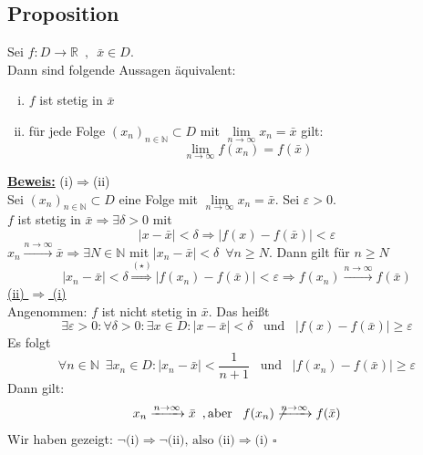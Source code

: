 \subsection{Proposition} %
\label{sub:proposition}
Sei $f: D \to \mathds{R} \enspace , \enspace \bar x \in D$. \\
Dann sind folgende Aussagen äquivalent:
\begin{enumerate}[(i)]
	\item $f$ ist stetig in $\bar x$
	\item für jede Folge $(x_n)_{n \in \mathds{N}} \subset D$ mit 
	$\lim\limits_{n \to \infty} x_n = \bar x$ gilt:
	\[
		\lim\limits_{n \to \infty} f(x_n) = f(\bar x)
	\]
\end{enumerate}
\underline{\textbf{Beweis:}} (i)$\Rightarrow$(ii)\\
Sei $(x_n)_{n \in \mathds{N}} \subset D$ eine Folge mit $\lim\limits_{n \to \infty} x_n = \bar x$. Sei $\varepsilon>0$.
\vspace{10pt} \\
$f$ ist stetig in $\bar x \Longrightarrow \exists \delta >0$ mit 
\[
	|x- \bar x|< \delta \Longrightarrow |f(x)-f(\bar x)|< \varepsilon \tag{$\star$}
\] 
$x_n \xrightarrow{n \to \infty} \bar x \Rightarrow \exists N \in \mathds{N}$ mit
$|x_n - \bar x|< \delta \enspace \forall n \geq N$. Dann gilt für $n \geq N$
\[
	|x_n - \bar x| < \delta \overset{(\star)}{\Rightarrow} |f(x_n)- f(\bar x)|<
	\varepsilon \Rightarrow f(x_n) \xrightarrow{n \to \infty} f(\bar x)
\]
\underline{(ii) $\Rightarrow$ (i)} \\
Angenommen: $f$ ist nicht stetig in $\bar x$. Das heißt
\[
	\exists \varepsilon >0 : \forall \delta>0 : \exists x \in D : |x - \bar x|< \delta
	\enspace \text{ und } \enspace |f(x)-f(\bar x)| \ge \varepsilon
\]
Es folgt 
\[
	\forall n \in \mathds{N} \enspace \exists x_n \in D : |x_n - \bar x|< 
	\frac{1}{n+1} \enspace \text{ und } \enspace |f(x_n)- f(\bar x)| \geq \varepsilon
\]
Dann gilt: 
\[
	x_n \xrightarrow{n \to \infty} \bar x \enspace , \text{aber } \enspace
	f(x_n) \not\xrightarrow{n \to \infty} f(\bar x)
\] Wir haben gezeigt:
$\neg \text{(i)} \Rightarrow  \neg \text{(ii), also (ii)} \Rightarrow \text{(i)}$ \hfill \( \square \)

